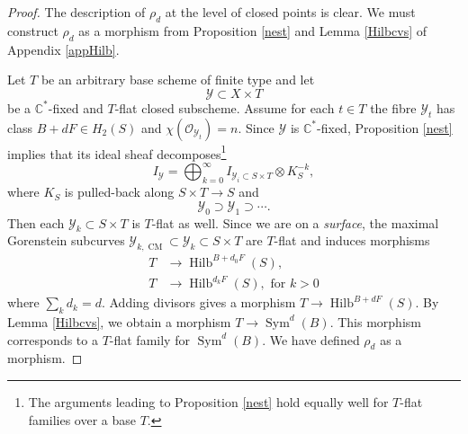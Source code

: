 \documentclass{amsart}
\theoremstyle{definition}
\newcommand{\CC} {\mathbb{C}}          %
\renewcommand{\O}{\mathcal{O}}
\newcommand{\Y}{\mathcal{Y}}
\newcommand{\Sym}{\operatorname{Sym}}
\newcommand{\Hilb}{\operatorname{Hilb}}
\newcommand{\CM}{\operatorname{CM}}
\begin{document}
\begin{proof}
The description of $\rho_d$ at the level of closed points is clear. We must construct $\rho_d$ as a morphism from Proposition \ref{nest} and Lemma \ref{Hilbcvs} of Appendix \ref{appHilb}.

Let $T$ be an arbitrary base scheme of finite type and let 
$$
\Y \subset X \times T
$$
be a $\CC^*$-fixed and $T$-flat closed subscheme. Assume for each $t \in T$ the fibre $\Y_t$ has class $B+dF \in H_2(S)$ and $\chi(\O_{\Y_t}) = n$. Since $\Y$ is $\CC^*$-fixed, Proposition \ref{nest} implies that its ideal sheaf decomposes\footnote{The arguments leading to Proposition \ref{nest} hold equally well for $T$-flat families over a base $T$.}
$$
I_{\Y} = \bigoplus_{k = 0}^{\infty} I_{\Y_i \subset S \times T} \otimes K_{S}^{-k},
$$
where $K_{S}$ is pulled-back along $S \times T \rightarrow S$ and 
$$
\Y_0 \supset \Y_1 \supset \cdots.
$$
Then each $\Y_k \subset S \times T$ is $T$-flat as well. Since we are on a \emph{surface}, the maximal Gorenstein subcurves $\Y_{k, \CM} \subset \Y_k \subset S \times T$ are $T$-flat and induces morphisms
\begin{align*}
T &\longrightarrow \Hilb^{B + d_0 F}(S), \\ 
T &\longrightarrow \Hilb^{d_k F}(S),  \textrm{ \ for \ } k>0
\end{align*}
where $\sum_k d_k = d$. Adding divisors gives a morphism $T \longrightarrow \Hilb^{B+dF}(S)$. By Lemma \ref{Hilbcvs}, we obtain a morphism $T \rightarrow \Sym^d(B)$. This morphism corresponds to a $T$-flat family for $\Sym^d(B)$. We have defined $\rho_d$ as a morphism. 
\end{proof}
\end{document}
